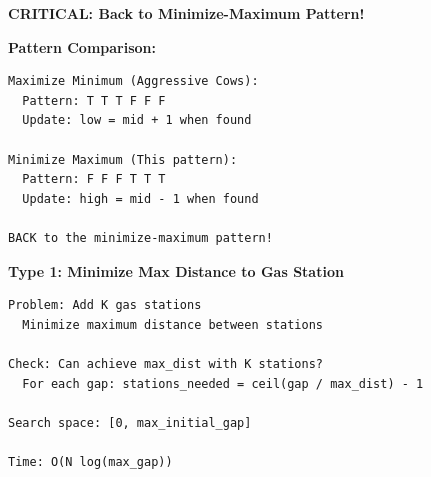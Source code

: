 \documentclass[11pt,a4paper,oneside]{book}
\begin{document}
\begin{tcolorbox}[
    enhanced,breakable,
    colback=dangered!10,
    colframe=dangered,
    boxrule=2pt,
    arc=4mm,
    title=\textbf{Complete Minimize Maximum Distance Algorithms}
]
\textbf{CRITICAL: Back to Minimize-Maximum Pattern!}

\textbf{Pattern Comparison:}
\begin{verbatim}
Maximize Minimum (Aggressive Cows):
  Pattern: T T T F F F
  Update: low = mid + 1 when found
  
Minimize Maximum (This pattern):
  Pattern: F F F T T T
  Update: high = mid - 1 when found
  
BACK to the minimize-maximum pattern!
\end{verbatim}

\textbf{Type 1: Minimize Max Distance to Gas Station}
\begin{verbatim}
Problem: Add K gas stations
  Minimize maximum distance between stations

Check: Can achieve max_dist with K stations?
  For each gap: stations_needed = ceil(gap / max_dist) - 1

Search space: [0, max_initial_gap]

Time: O(N log(max_gap))
\end{verbatim}
\end{tcolorbox}
\end{document}
